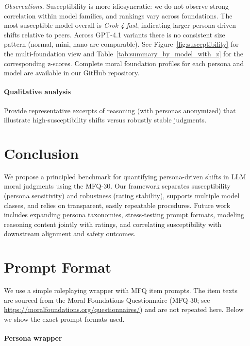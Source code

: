 \documentclass{article}
\begin{document}
\noindent\textit{Observations.} Susceptibility is more idiosyncratic: we do not observe strong correlation within model families, and rankings vary across foundations. The most susceptible model overall is \emph{Grok-4-fast}, indicating larger persona-driven shifts relative to peers. Across GPT-4.1 variants there is no consistent size pattern (normal, mini, nano are comparable). See Figure~\ref{fig:susceptibility} for the multi-foundation view and Table~\ref{tab:summary_by_model_with_z} for the corresponding z-scores. Complete moral foundation profiles for each persona and model are available in our GitHub repository.



\paragraph{Qualitative analysis}
Provide representative excerpts of reasoning (with personas anonymized) that illustrate high-susceptibility shifts versus robustly stable judgments.

\section{Conclusion}
We propose a principled benchmark for quantifying persona-driven shifts in LLM moral judgments using the MFQ-30. Our framework separates susceptibility (persona sensitivity) and robustness (rating stability), supports multiple model classes, and relies on transparent, easily repeatable procedures. Future work includes expanding persona taxonomies, stress-testing prompt formats, modeling reasoning content jointly with ratings, and correlating susceptibility with downstream alignment and safety outcomes.







\appendix

\section{Prompt Format}
We use a simple roleplaying wrapper with MFQ item prompts. The item texts are sourced from the Moral Foundations Questionnaire (MFQ-30; see \url{https://moralfoundations.org/questionnaires/}) and are not repeated here. Below we show the exact prompt formats used.

\paragraph{Persona wrapper}
\end{document}
